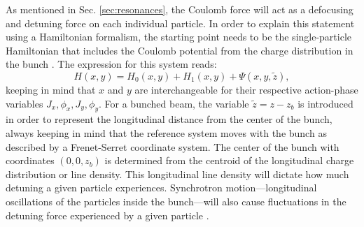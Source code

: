 As mentioned in Sec. \ref{sec:resonances}, the Coulomb force will act as a defocusing and detuning force on each individual particle. In order to explain this statement using a Hamiltonian formalism, the starting point needs to be the single-particle Hamiltonian that includes the Coulomb potential from the charge distribution in the bunch \cite{witchcraft}. The expression for this system reads:
\begin{equation}
    \label{eq:hpsi}
    H(x,y)=H_{0}(x,y)+H_{1}(x,y)+\Psi(x,y,\tilde{z}), 
\end{equation}     
keeping in mind that $x$ and $y$ are interchangeable for their respective action-phase variables $J_x,\phi_x,J_y, \phi_y$. For a bunched beam, the variable $\tilde{z}=z-z_b$ is introduced in order to represent the longitudinal distance from the center of the bunch, always keeping in mind that the reference system moves with the bunch as described by a Frenet-Serret coordinate system. The center of the bunch with coordinates $(0,0,z_b)$ is determined from the centroid of the longitudinal charge distribution or line density. This longitudinal line density will dictate how much detuning a given particle experiences. Synchrotron motion---longitudinal oscillations of the particles inside the bunch---will also cause fluctuations in the detuning force experienced by a given particle \cite{sylee}. 

